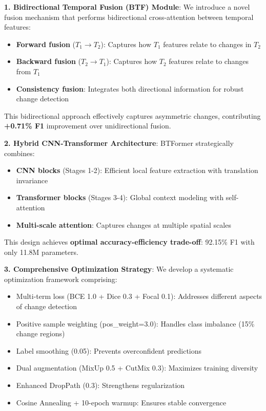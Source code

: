 \documentclass[journal]{IEEEtran}
\begin{document}
\textbf{1. Bidirectional Temporal Fusion (BTF) Module}: We introduce a novel fusion mechanism that performs bidirectional cross-attention between temporal features:
\begin{itemize}
    \item \textbf{Forward fusion} ($T_1 \rightarrow T_2$): Captures how $T_1$ features relate to changes in $T_2$
    \item \textbf{Backward fusion} ($T_2 \rightarrow T_1$): Captures how $T_2$ features relate to changes from $T_1$
    \item \textbf{Consistency fusion}: Integrates both directional information for robust change detection
\end{itemize}

This bidirectional approach effectively captures asymmetric changes, contributing \textbf{+0.71\% F1} improvement over unidirectional fusion.

\textbf{2. Hybrid CNN-Transformer Architecture}: BTFormer strategically combines:
\begin{itemize}
    \item \textbf{CNN blocks} (Stages 1-2): Efficient local feature extraction with translation invariance
    \item \textbf{Transformer blocks} (Stages 3-4): Global context modeling with self-attention
    \item \textbf{Multi-scale attention}: Captures changes at multiple spatial scales
\end{itemize}

This design achieves \textbf{optimal accuracy-efficiency trade-off}: 92.15\% F1 with only 11.8M parameters.

\textbf{3. Comprehensive Optimization Strategy}: We develop a systematic optimization framework comprising:
\begin{itemize}
    \item Multi-term loss (BCE 1.0 + Dice 0.3 + Focal 0.1): Addresses different aspects of change detection
    \item Positive sample weighting (pos\_weight=3.0): Handles class imbalance (15\% change regions)
    \item Label smoothing (0.05): Prevents overconfident predictions
    \item Dual augmentation (MixUp 0.5 + CutMix 0.3): Maximizes training diversity
    \item Enhanced DropPath (0.3): Strengthens regularization
    \item Cosine Annealing + 10-epoch warmup: Ensures stable convergence
\end{itemize}
\end{document}

